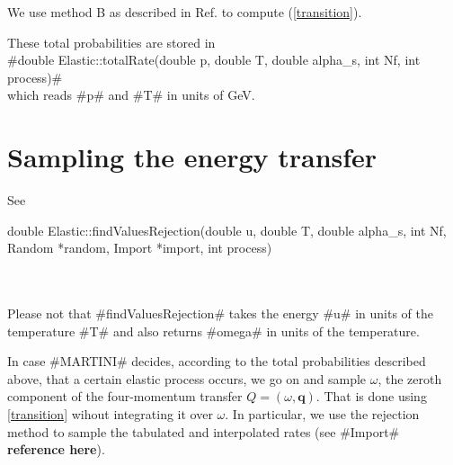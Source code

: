 We use method B as described in Ref. \cite{Schenke:2009ik} 
to compute (\ref{transition}).

These total probabilities are stored in \\
#double Elastic::totalRate(double p, double T, double alpha_s, int Nf, int process)# \\
which reads #p# and #T# in units of GeV.

\section{Sampling the energy transfer}
\label{omegasampling}
See\\

\begin{boxedverbatim}
double Elastic::findValuesRejection(double u, double T, double alpha_s, int Nf,
                                    Random *random, Import *import, int process)
\end{boxedverbatim}
~\\
~\\
Please not that #findValuesRejection# takes the energy #u# in units of the 
temperature #T# and also returns #omega# in units of the temperature.

In case #MARTINI# decides, according to the total probabilities described above, 
that a certain elastic process occurs, we go on and sample $\omega$, 
the zeroth component of the four-momentum transfer $Q=(\omega,\mathbf{q})$. 
That is done using \ref{transition} wihout integrating it over $\omega$.
In particular, we use the rejection method to sample the tabulated and 
interpolated rates (see #Import# {\bf reference here}).

